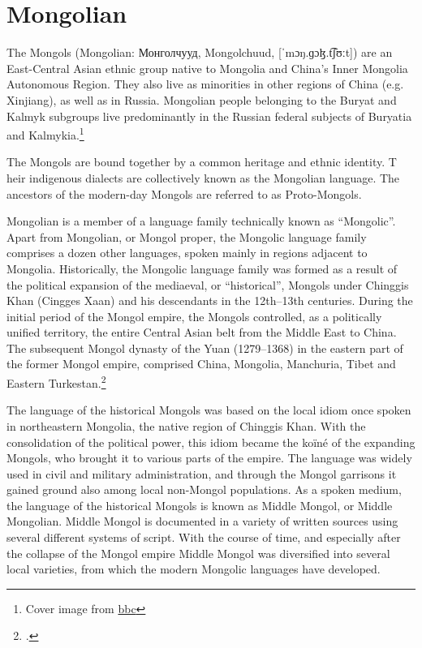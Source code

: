 \chapter{Mongolian}
The Mongols (Mongolian: Монголчууд, Mongolchuud, [ˈmɔŋ.ɡɔɮ.t͡ʃʊːt]) are an East-Central Asian ethnic group native to Mongolia and China's Inner Mongolia Autonomous Region. They also live as minorities in other regions of China (e.g. Xinjiang), as well as in Russia. Mongolian people belonging to the Buryat and Kalmyk subgroups live predominantly in the Russian federal subjects of Buryatia and Kalmykia.\footnote{Cover image from \href{http://www.bbc.com/news/world-asia-china-25979564}{bbc}}

The Mongols are bound together by a common heritage and ethnic identity. T
heir indigenous dialects are collectively known as the Mongolian language. The ancestors of the modern-day Mongols are referred to as Proto-Mongols.

Mongolian is a member of a language family technically known as “Mongolic”. Apart
from Mongolian, or Mongol proper, the Mongolic language family comprises a dozen
other languages, spoken mainly in regions adjacent to Mongolia. Historically, the
Mongolic language family was formed as a result of the political expansion of the mediaeval,
or “historical”, Mongols under Chinggis Khan (Cingges Xaan) and his descendants
in the 12th–13th centuries. During the initial period of the Mongol empire, the Mongols
controlled, as a politically unified territory, the entire Central Asian belt from the Middle
East to China. The subsequent Mongol dynasty of the Yuan (1279–1368) in the eastern
part of the former Mongol empire, comprised China, Mongolia, Manchuria, Tibet and
Eastern Turkestan.\footcite{book:janhunen2012}

The language of the historical Mongols was based on the local idiom once spoken in
northeastern Mongolia, the native region of Chinggis Khan. With the consolidation of
the political power, this idiom became the koïné of the expanding Mongols, who brought
it to various parts of the empire. The language was widely used in civil and military
administration, and through the Mongol garrisons it gained ground also among local
non-Mongol populations. As a spoken medium, the language of the historical Mongols
is known as Middle Mongol, or Middle Mongolian. Middle Mongol is documented in
a variety of written sources using several different systems of script. With the course of
time, and especially after the collapse of the Mongol empire Middle Mongol was diversified
into several local varieties, from which the modern Mongolic languages have
developed.


